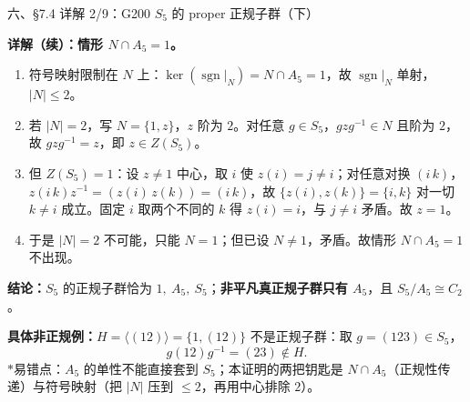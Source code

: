 \documentclass[aspectratio=169,10pt,fontset=none]{ctexbeamer}
\newcommand{\key}[1]{\textcolor{ink}{\bfseries #1}}
\newcommand{\starpt}{\textcolor{accent}{\bfseries$\ast$}}
\begin{document}
\begin{frame}[t]{六、\S7.4 详解 2/9：G200 $S_5$ 的 proper 正规子群（下）}
\scriptsize

\key{详解（续）：情形 $N\cap A_5=1$。}
\begin{enumerate}\setlength{\itemsep}{1pt}
\item 符号映射限制在 $N$ 上：$\ker(\operatorname{sgn}|_N)=N\cap A_5=1$，故 $\operatorname{sgn}|_N$ 单射，$|N|\le2$。
\item 若 $|N|=2$，写 $N=\{1,z\}$，$z$ 阶为 $2$。对任意 $g\in S_5$，$gzg^{-1}\in N$ 且阶为 $2$，故 $gzg^{-1}=z$，即 $z\in Z(S_5)$。
\item 但 $Z(S_5)=1$：设 $z\ne1$ 中心，取 $i$ 使 $z(i)=j\ne i$；对任意对换 $(i\,k)$，$z(i\,k)z^{-1}=(z(i)\,z(k))=(i\,k)$，故 $\{z(i),z(k)\}=\{i,k\}$ 对一切 $k\ne i$ 成立。固定 $i$ 取两个不同的 $k$ 得 $z(i)=i$，与 $j\ne i$ 矛盾。故 $z=1$。
\item 于是 $|N|=2$ 不可能，只能 $N=1$；但已设 $N\ne1$，矛盾。故情形 $N\cap A_5=1$ 不出现。
\end{enumerate}
\key{结论：}$S_5$ 的正规子群恰为 $1,\ A_5,\ S_5$；\textbf{非平凡真正规子群只有 $A_5$}，且 $S_5/A_5\cong C_2$。

\key{具体非正规例：}$H=\langle(12)\rangle=\{1,(12)\}$ 不是正规子群：取 $g=(123)\in S_5$，
\[ g(12)g^{-1}=(23)\notin H. \]
\starpt 易错点：$A_5$ 的单性不能直接套到 $S_5$；本证明的两把钥匙是 $N\cap A_5$（正规性传递）与符号映射（把 $|N|$ 压到 $\le2$，再用中心排除 $2$）。
\end{frame}
\end{document}
